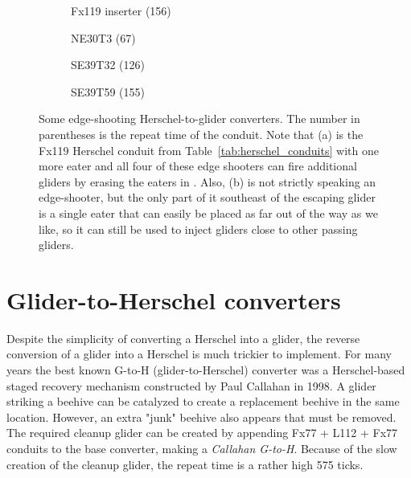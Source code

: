 \begin{figure}[!htb]
	\centering
	\begin{subfigure}{.22\textwidth}
		\centering
		\caption{Fx119 inserter (156)}
		\label{fig:herschel_to_glider_edge_3}
	\end{subfigure}\quad%
	\begin{subfigure}{.22\textwidth}
		\centering\vspace*{0.35cm}
		\caption{NE30T3 (67)}
		\label{fig:herschel_to_glider_edge_4}
	\end{subfigure}\quad%
	\begin{subfigure}{.22\textwidth}
		\centering\vspace*{0.66cm}
		\caption{SE39T32 (126)}
		\label{fig:herschel_to_glider_edge_1}
	\end{subfigure}\quad%
	\begin{subfigure}{.22\textwidth}
		\centering
		\caption{SE39T59 (155)}
		\label{fig:herschel_to_glider_edge_2}
	\end{subfigure}
	\caption{Some edge-shooting Herschel-to-glider converters. The number in parentheses is the repeat time of the conduit. Note that (a) is the Fx119 Herschel conduit from Table~\ref{tab:herschel_conduits} with one more eater and all four of these edge shooters can fire additional gliders by erasing the eaters in . Also, (b) is not strictly speaking an edge-shooter, but the only part of it southeast of the escaping glider is a single eater that can easily be placed as far out of the way as we like, so it can still be used to inject gliders close to other passing gliders.}\label{fig:herschel_to_glider_edge}
\end{figure}


\section{Glider-to-Herschel converters}\label{sec:g_to_h}
Despite the simplicity of converting a Herschel into a glider, the reverse conversion of a glider into a Herschel is much trickier to implement. For many years the best known G-to-H (glider-to-Herschel) converter was a Herschel-based staged recovery mechanism constructed by Paul Callahan in 1998. A glider striking a beehive can be catalyzed to create a replacement beehive in the same location.  However, an extra "junk" beehive also appears that must be removed.  The required cleanup glider can be created by appending Fx77 + L112 + Fx77 conduits to the base converter, making a \emph{Callahan G-to-H}.  Because of the slow creation of the cleanup glider, the repeat time is a rather high 575 ticks.

